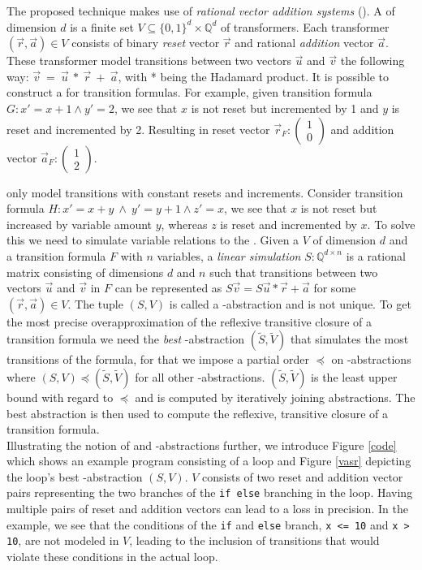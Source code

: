The proposed technique makes use of \textsl{rational vector addition systems} (\qvasr). A \qvasr of dimension $d$ is a finite set $V \subseteq \{0, 1\}^d \times \mathbb{Q}^d$ of transformers. Each transformer $(\vec{r}, \vec{a}) \in V$ consists of binary \textsl{reset} vector $\vec{r}$ and rational \textsl{addition} vector $\vec{a}$. These transformer model transitions between two vectors $\vec{u}$ and $\vec{v}$ the following way: $\vec{v}\ =\ \vec{u}\ *\ \vec{r}\ +\ \vec{a}$, with * being the Hadamard product. It is possible to construct a \qvasr for transition formulas. For example, given transition formula $G: x' = x + 1 \land y' = 2$, we see that $x$ is not reset but incremented by 1 and $y$ is reset and incremented by 2. Resulting in reset vector $\vec{r}_F: \begin{pmatrix} 1 \\ 0\end{pmatrix}$ and addition vector $\vec{a}_F: \begin{pmatrix} 1 \\ 2\end{pmatrix}$. \par
\qvasr only model transitions with constant resets and increments. Consider transition formula $H: x' = x + y\ \land\ y' = y + 1 \land z' = x$, we see that $x$ is not reset but increased by variable amount $y$, whereas $z$ is reset and incremented by $x$. To solve this we need to simulate variable relations to the \qvasr. Given a \qvasr $V$ of dimension $d$ and a transition formula $F$ with $n$ variables, a \textsl{linear simulation} $S: \mathbb{Q}^{d \times n} $ is a rational matrix consisting of dimensions $d$ and $n$ such that transitions between two vectors $\vec{u}$ and $\vec{v}$ in $F$ can be represented as $S\vec{v} = S\vec{u} * \vec{r} + \vec{a}$ for some $(\vec{r}, \vec{a}) \in V$. The tuple $(S, V)$ is called a \qvasr-abstraction and is not unique. To get the most precise overapproximation of the reflexive transitive closure of a transition formula we need the \textsl{best} \qvasr-abstraction $(\tilde{S}, \tilde{V})$ that simulates the most transitions of the formula, for that we impose a partial order $\preceq$ on \qvasr-abstractions where $(S, V) \preceq (\tilde{S}, \tilde{V})$ for all other \qvasr-abstractions. $(\tilde{S}, \tilde{V})$ is the least upper bound with regard to $\preceq$ and is computed by iteratively joining abstractions. The best abstraction is then used to compute the reflexive, transitive closure of a transition formula. \\ Illustrating the notion of \qvasr and \qvasr-abstractions further, we introduce Figure \ref{code} which shows an example program consisting of a loop and Figure \ref{vasr} depicting the loop's best \qvasr-abstraction $(S,V)$. $V$ consists of two reset and addition vector pairs representing the two branches of the \texttt{if else} branching in the loop. Having multiple pairs of reset and addition vectors can lead to a loss in precision. In the example, we see that the conditions of the \texttt{if} and \texttt{else} branch, \texttt{x <= 10} and \texttt{x > 10}, are not modeled in $V$, leading to the inclusion of transitions that would violate these conditions in the actual loop. \\
